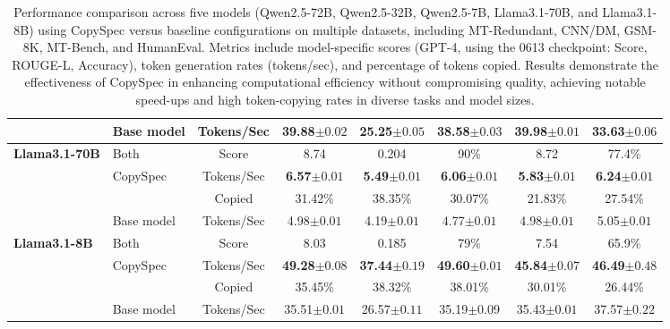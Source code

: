 \begin{table*}[h!]
{\begin{tabular}{l l c c c c c c}
            & Base model & Tokens/Sec & 39.88$\pm0.02$ & 25.25$\pm0.05$ & 38.58$\pm0.03$ & 39.98$\pm0.01$ & 33.63$\pm0.06$ \\
\midrule
\multirow{4}{*}{\textbf{Llama3.1-70B}} & Both & Score & 8.74 & 0.204 & 90\% & 8.72 & 77.4\% \\
\cmidrule(lr){2-8}
            & CopySpec & Tokens/Sec & \textbf{6.57}$\pm0.01$ & \textbf{5.49}$\pm0.01$ & \textbf{6.06}$\pm0.01$ & \textbf{5.83}$\pm0.01$ & \textbf{6.24}$\pm0.01$ \\
            &          & Copied  & 31.42\% & 38.35\% & 30.07\% & 21.83\% & 27.54\% \\
            & Base model & Tokens/Sec & 4.98$\pm0.01$ & 4.19$\pm0.01$ & 4.77$\pm0.01$ & 4.98$\pm0.01$ & 5.05$\pm0.01$ \\
\midrule
\multirow{4}{*}{\textbf{Llama3.1-8B}} & Both & Score & 8.03 & 0.185 & 79\% & 7.54 & 65.9\% \\
\cmidrule(lr){2-8}
            & CopySpec & Tokens/Sec & \textbf{49.28}$\pm0.08$ & \textbf{37.44}$\pm0.19$ & \textbf{49.60}$\pm0.01$ & \textbf{45.84}$\pm0.07$ & \textbf{46.49}$\pm0.48$ \\
            &          & Copied  & 35.45\% & 38.32\% & 38.01\% & 30.01\% & 26.44\% \\
            & Base model & Tokens/Sec & 35.51$\pm0.01$ & 26.57$\pm0.11$ & 35.19$\pm0.09$ & 35.43$\pm0.01$ & 37.57$\pm0.22$ \\
\midrule
\bottomrule
\end{tabular}
}
\caption{Performance comparison across five models (Qwen2.5-72B, Qwen2.5-32B, Qwen2.5-7B, Llama3.1-70B, and Llama3.1-8B) using CopySpec versus baseline configurations on multiple datasets, including MT-Redundant, CNN/DM, GSM-8K, MT-Bench, and HumanEval. Metrics include model-specific scores 
(GPT-4, using the 0613 checkpoint: Score, ROUGE-L, Accuracy), token generation rates (tokens/sec), and percentage of tokens copied. Results demonstrate the effectiveness of CopySpec in enhancing computational efficiency without compromising quality, achieving notable speed-ups and high token-copying rates in diverse tasks and model sizes.}

\label{tab:performance}
\end{table*}



